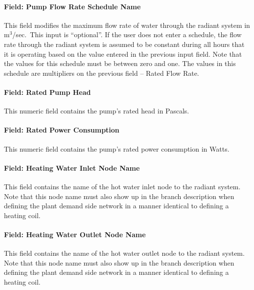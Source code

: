 \paragraph{Field: Pump Flow Rate Schedule Name}\label{field-pump-flow-rate-schedule-name-001}

This field modifies the maximum flow rate of water through the radiant system in m\(^{3}\)/sec.~This input is ``optional''. If the user does not enter a schedule, the flow rate through the radiant system is assumed to be constant during all hours that it is operating based on the value entered in the previous input field. Note that the values for this schedule must be between zero and one. The values in this schedule are multipliers on the previous field -- Rated Flow Rate.

\paragraph{Field: Rated Pump Head}\label{field-rated-pump-head}

This numeric field contains the pump's rated head in Pascals.

\paragraph{Field: Rated Power Consumption}\label{field-rated-power-consumption-000}

This numeric field contains the pump's rated power consumption in Watts.

\paragraph{Field: Heating Water Inlet Node Name}\label{field-heating-water-inlet-node-name-1}

This field contains the name of the hot water inlet node to the radiant system. Note that this node name must also show up in the branch description when defining the plant demand side network in a manner identical to defining a heating coil.

\paragraph{Field: Heating Water Outlet Node Name}\label{field-heating-water-outlet-node-name-1}

This field contains the name of the hot water outlet node to the radiant system. Note that this node name must also show up in the branch description when defining the plant demand side network in a manner identical to defining a heating coil.

